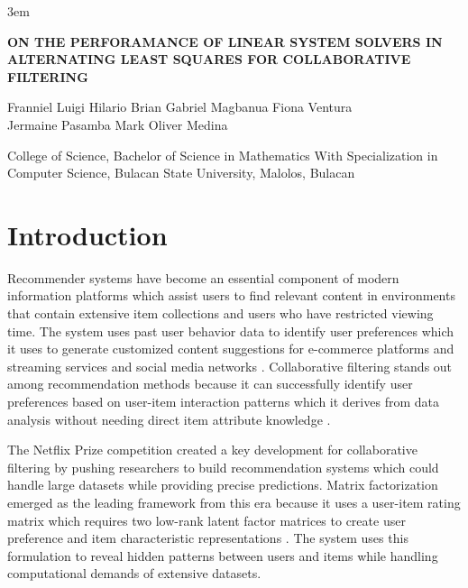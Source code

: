 \documentclass[12pt,a4paper]{report}
\author{
Franniel Luigi Hilario
}
\begin{document}
\emergencystretch 3em
\sloppy
\doublespacing

\begin{titlepage}
\centering %

\begin{minipage}[c][3\baselineskip][c]{0.9\linewidth}
\centering\bfseries\large\MakeUppercase{
On the Perforamance of Linear System Solvers in Alternating Least Squares for Collaborative Filtering
}
\end{minipage}

\vspace{0.5in}
{\centering Franniel Luigi Hilario \quad Brian Gabriel Magbanua  \quad Fiona Ventura\\ Jermaine Pasamba \quad Mark Oliver Medina  }

\vspace{0.5in}

{
College of Science, Bachelor of Science in Mathematics
With Specialization in Computer Science,
Bulacan State University, Malolos, Bulacan
}

\vspace{1in}
\begin{abstract}
\begin{justify}

Todo

\end{justify}
\end{abstract}
\end{titlepage}
\chapter*{Introduction}

Recommender systems have become an essential component of modern information platforms which assist users to find relevant content in environments that contain extensive item collections and users who have restricted viewing time. The system uses past user behavior data to identify user preferences which it uses to generate customized content suggestions for e-commerce platforms and streaming services and social media networks \parencite{ricci2015recommender}. Collaborative filtering stands out among recommendation methods because it can successfully identify user preferences based on user-item interaction patterns which it derives from data analysis without needing direct item attribute knowledge \parencite{koren2009matrix}.

The Netflix Prize competition created a key development for collaborative filtering by pushing researchers to build recommendation systems which could handle large datasets while providing precise predictions. Matrix factorization emerged as the leading framework from this era because it uses a user-item rating matrix which requires two low-rank latent factor matrices to create user preference and item characteristic representations \parencite{koren2009matrix,takacs2009scalable}. The system uses this formulation to reveal hidden patterns between users and items while handling computational demands of extensive datasets.
\end{document}
